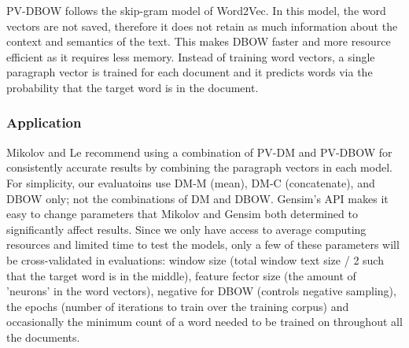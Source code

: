 PV-DBOW follows the skip-gram model of Word2Vec. In this model, the word vectors are not saved, therefore it does not retain as much information about the context and semantics of the text. This makes DBOW faster and more resource efficient as it requires less memory. Instead of training word vectors, a single paragraph vector is trained for each document and it predicts words via the probability that the target word is in the document.

\subsubsection{Application}

Mikolov and Le recommend using a combination of PV-DM and PV-DBOW for consistently accurate results by combining the paragraph vectors in each model. \cite{RefWorks:doc:5a6e5746e4b0d609eec798d7} For simplicity, our evaluatoins use DM-M (mean), DM-C (concatenate), and DBOW only; not the combinations of DM and DBOW. Gensim's API makes it easy to change parameters that Mikolov and Gensim both determined to significantly affect results. \cite{RefWorks:doc:5aa698a1e4b0dae9a96dde2d} \cite{RefWorks:doc:5a6e5746e4b0d609eec798d7} Since we only have access to average computing resources and limited time to test the models, only a few of these parameters will be cross-validated in evaluations: window size (total window text size / 2 such that the target word is in the middle), feature fector size (the amount of 'neurons' in the word vectors), negative for DBOW (controls negative sampling), the epochs (number of iterations to train over the training corpus) and occasionally the minimum count of a word needed to be trained on throughout all the documents.



